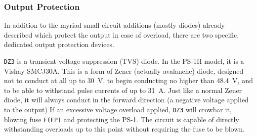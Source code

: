 \begin{multicols}{2}
\subsubsection{Output Protection}
In addition to the myriad small circuit additions (mostly diodes) already
described which protect the output in case of overload, there are two specific,
dedicated output protection devices.

\texttt{DZ3} is a transient voltage suppression (TVS) diode. In the PS-1H
model, it is a Vishay SMCJ30A. This is a form of Zener (actually avalanche)
diode, designed not to conduct at all up to 30~V, to begin conducting no higher
than 48.4~V, and to be able to withstand pulse currents of up to 31~A. Just
like a normal Zener diode, it will always conduct in the forward direction
(a negative voltage applied to the output) If an excessive voltage overload
applied, \texttt{DZ3} will crowbar it, blowing fuse \texttt{F(FP)} and
protecting the PS-1. The circuit is capable of directly withstanding overloads
up to this point without requiring the fuse to be blown.

\end{multicols}
